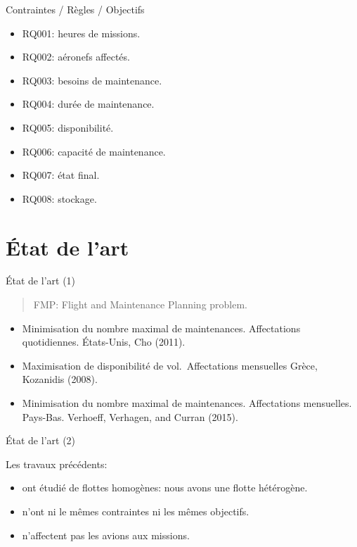 \documentclass[ignorenonframetext,]{beamer}
\providecommand{\tightlist}{%
  \setlength{\itemsep}{0pt}\setlength{\parskip}{0pt}}
\begin{document}
\begin{frame}{Contraintes / Règles / Objectifs}

\begin{itemize}[<+->]
\tightlist
\item
  RQ001: heures de missions.
\item
  RQ002: aéronefs affectés.
\item
  RQ003: besoins de maintenance.
\item
  RQ004: durée de maintenance.
\item
  RQ005: disponibilité.
\item
  RQ006: capacité de maintenance.
\item
  RQ007: état final.
\item
  RQ008: stockage.
\end{itemize}

\end{frame}

\section{État de l'art}\label{etat-de-lart}

\begin{frame}{État de l'art (1)}

\begin{quote}
FMP: Flight and Maintenance Planning problem.
\end{quote}

\begin{itemize}[<+->]
\tightlist
\item
  Minimisation du nombre maximal de maintenances. Affectations
  quotidiennes. États-Unis, Cho (2011).
\item
  Maximisation de disponibilité de vol.~Affectations mensuelles Grèce,
  Kozanidis (2008).
\item
  Minimisation du nombre maximal de maintenances. Affectations
  mensuelles. Pays-Bas. Verhoeff, Verhagen, and Curran (2015).
\end{itemize}

\end{frame}

\begin{frame}{État de l'art (2)}

Les travaux précédents:

\begin{itemize}[<+->]
\tightlist
\item
  ont étudié de flottes homogènes: nous avons une flotte hétérogène.
\item
  n'ont ni le mêmes contraintes ni les mêmes objectifs.
\item
  n'affectent pas les avions aux missions.
\end{itemize}

\end{frame}
\end{document}
